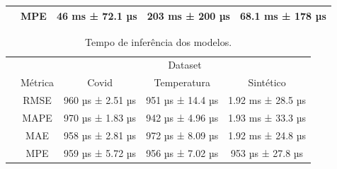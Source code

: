 \begin{table}[!htp]
\begin{tabular}{|c|c|ccc|}
        \rowcolor[HTML]{EFEFEF}
        \multirow{-4}{*}{\cellcolor[HTML]{C0C0C0}Prophet} & MPE                                               & \multicolumn{1}{c|}{\cellcolor[HTML]{EFEFEF}46 ms ± 72.1 µs}            & \multicolumn{1}{c|}{\cellcolor[HTML]{EFEFEF}203 ms ± 200 µs}           & 68.1 ms ± 178 µs          \\ \hline
    \end{tabular}
\end{table}

\begin{table}[!htp]
    \caption{Tempo de inferência dos modelos.}
    \setlength\extrarowheight{5pt}
    \begin{tabular}{|c|c|ccc|}
        \hline
        \rowcolor[HTML]{C0C0C0}
        \cellcolor[HTML]{C0C0C0}                          & \cellcolor[HTML]{C0C0C0}                          & \multicolumn{3}{c|}{\cellcolor[HTML]{C0C0C0}Dataset}                                                                                                                         \\ \cline{3-5}
        \rowcolor[HTML]{C0C0C0}
        \multirow{-2}{*}{\cellcolor[HTML]{C0C0C0}Modelo}  & \multirow{-2}{*}{\cellcolor[HTML]{C0C0C0}Métrica} & \multicolumn{1}{c|}{\cellcolor[HTML]{C0C0C0}Covid}                      & \multicolumn{1}{c|}{\cellcolor[HTML]{C0C0C0}Temperatura}               & Sintético                 \\ \hline
        \cellcolor[HTML]{C0C0C0}                          & RMSE                                              & \multicolumn{1}{c|}{960 µs ± 2.51 µs}                                   & \multicolumn{1}{c|}{951 µs ± 14.4 µs}                                  & 1.92 ms ± 28.5 µs         \\ \cline{2-5}
        \rowcolor[HTML]{EFEFEF}
        \cellcolor[HTML]{C0C0C0}                          & MAPE                                              & \multicolumn{1}{c|}{\cellcolor[HTML]{EFEFEF}970 µs ± 1.83 µs}           & \multicolumn{1}{c|}{\cellcolor[HTML]{EFEFEF}942 µs ± 4.96 µs}          & 1.93 ms ± 33.3 µs         \\ \cline{2-5}
        \cellcolor[HTML]{C0C0C0}                          & MAE                                               & \multicolumn{1}{c|}{958 µs ± 2.81 µs}                                   & \multicolumn{1}{c|}{972 µs ± 8.09 µs}                                  & 1.92 ms ± 24.8 µs         \\ \cline{2-5}
        \rowcolor[HTML]{EFEFEF}
        \multirow{-4}{*}{\cellcolor[HTML]{C0C0C0}ARIMA}   & MPE                                               & \multicolumn{1}{c|}{\cellcolor[HTML]{EFEFEF}959 µs ± 5.72 µs}           & \multicolumn{1}{c|}{\cellcolor[HTML]{EFEFEF}956 µs ± 7.02 µs}          & 953 µs ± 27.8 µs          \\ \hline

\end{tabular}
\end{table}
